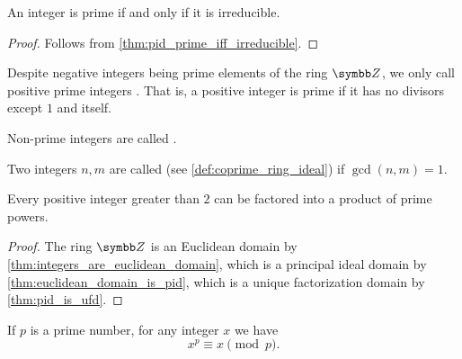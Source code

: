 \begin{lemma}\label{thm:euclids_lemma}
  An integer is prime if and only if it is irreducible.
\end{lemma}
\begin{proof}
  Follows from \cref{thm:pid_prime_iff_irreducible}.
\end{proof}

\begin{definition}\label{def:prime_number}
  Despite negative integers being prime elements of the ring \( \Z \), we only call positive prime integers . That is, a positive integer is prime if it has no divisors except \( 1 \) and itself.

  Non-prime integers are called .
\end{definition}

\begin{definition}\label{def:coprime_numbers}
  Two integers \( n, m \) are called  (see \cref{def:coprime_ring_ideal}) if \( \gcd(n, m) = 1 \).
\end{definition}

\begin{theorem}\label{thm:fundamental_theorem_of_arithmetic}
  Every positive integer greater than \( 2 \) can be factored into a product of prime powers.
\end{theorem}
\begin{proof}
  The ring \( \Z \) is an Euclidean domain by \cref{thm:integers_are_euclidean_domain}, which is a principal ideal domain by \cref{thm:euclidean_domain_is_pid}, which is a unique factorization domain by \cref{thm:pid_is_ufd}.
\end{proof}

\begin{proposition}\label{thm:fermats_little_theorem}
  If \( p \) is a prime number, for any integer \( x \) we have
  \begin{equation*}
    x^p \equiv x \pmod p.
  \end{equation*}
\end{proposition}
